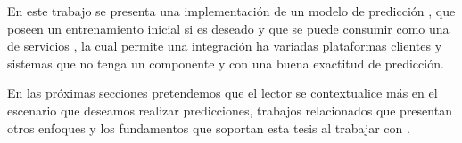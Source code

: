 En este trabajo se presenta una implementación de un modelo de predicción \online, que poseen un entrenamiento inicial \offline si es deseado y que se puede consumir como una \API de servicios \REST, la cual permite una integración ha variadas plataformas clientes y sistemas que no tenga un componente \online y con una buena exactitud de predicción. 

En las próximas secciones pretendemos que el lector se contextualice más en el escenario que deseamos realizar predicciones, trabajos relacionados que presentan otros enfoques y los fundamentos que soportan esta tesis al trabajar con \webasccesslog.



